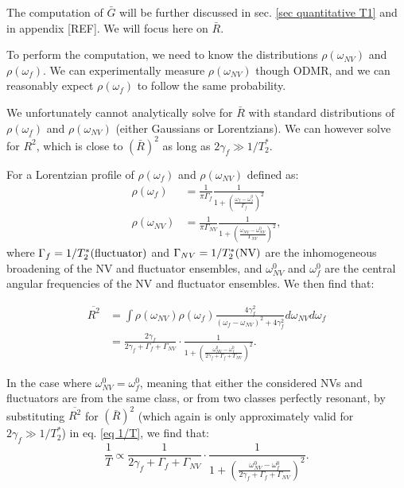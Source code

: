 \documentclass[a4paper,11pt]{report}
\begin{document}
The computation of $\bar G$ will be further discussed in sec. \ref{sec quantitative T1} and in appendix [REF]. We will focus here on $\bar R$.

To perform the computation, we need to know the distributions $\rho(\omega_{NV})$ and $\rho(\omega_{f})$. We can experimentally measure $\rho(\omega_{NV})$ though ODMR, and we can reasonably expect $\rho(\omega_{f})$ to follow the same probability.

We unfortunately cannot analytically solve for $\bar R$ with standard distributions of $\rho(\omega_{f})$ and $\rho(\omega_{NV})$ (either Gaussians or Lorentzians). We can however solve for $\overline{R^2}$, which is close to $(\bar{R})^2$ as long as $2 \gamma_f \gg 1/T_2^*$.

For a Lorentzian profile of $\rho(\omega_{f})$ and $\rho(\omega_{NV})$ defined as:
\begin{align*}
\rho(\omega_{f})&=\frac{1}{\pi \Gamma_f} \frac{1}{1+ \left(\frac{\omega_f-\omega^0_f}{\Gamma_f}\right)^2} \\
\rho(\omega_{NV})&=\frac{1}{\pi \Gamma_{NV}} \frac{1}{1+ \left(\frac{\omega_{NV}-\omega^0_{NV}}{\Gamma_{NV}}\right)^2},
\end{align*}
where $\Gamma_{f}=1/T_2^*(\rm fluctuator)$ and $\Gamma_{NV}=1/T_2^*(\rm NV)$ are the inhomogeneous broadening of the NV and fluctuator ensembles, and $\omega^0_{NV}$ and $\omega^0_{f}$ are the central angular frequencies of the NV and fluctuator ensembles. We then find that:

\begin{align*}
\overline{R^2}&= \int \rho(\omega_{NV}) \rho(\omega_{f}) \frac{4\gamma_f^2}{(\omega_f - \omega_{NV})^2+4\gamma_f^2} d\omega_{NV} d\omega_{f} \\
&=\frac{2 \gamma_f}{2 \gamma_f + \Gamma_f + \Gamma_{NV}} \cdot \frac{1}{1+\left(\frac{\omega^0_{NV}-\omega^0_{f}}{2 \gamma_f + \Gamma_f + \Gamma_{NV}}\right)^2}.
\end{align*}

In the case where $\omega^0_{NV}=\omega^0_{f}$, meaning that either the considered NVs and fluctuators are from the same class, or from two classes perfectly resonant, by substituting $\overline{R ^2}$ for $(\bar{R})^2$ (which again is only approximately valid for $2 \gamma_f \gg 1/T_2^*$) in eq. \ref{eq 1/T}, we find that:
\begin{equation}
\label{eq 1/T avec T2*}
\frac{1}{T} \propto \frac{1}{2\gamma_f + \Gamma_f + \Gamma_{NV}}\cdot \frac{1}{1+\left(\frac{\omega^0_{NV}-\omega^0_{f}}{2 \gamma_f + \Gamma_f + \Gamma_{NV}}\right)^2}.
\end{equation}
\end{document}
